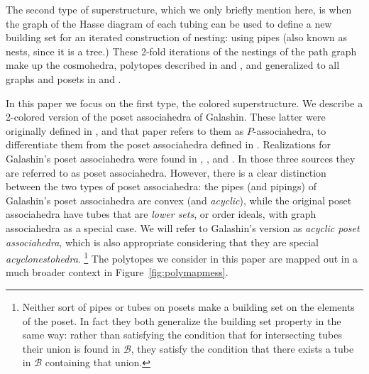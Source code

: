 \documentclass{article}
\begin{document}
The second type of superstructure, which we only briefly mention here, is when the graph of the Hasse diagram of each tubing can be used to define a new building set for an iterated construction of nesting: using pipes (also known as nests, since it is a tree.) These 2-fold iterations of the nestings of the path graph make up the cosmohedra, polytopes described in \cite{Arkani-Hamed:2024jbp} and \cite{ardilacosmo}, and generalized to all graphs and posets in \cite{Glew:2025otn} and \cite{forc-glew}. 

In this paper we focus on the first type, the colored superstructure. We describe a 2-colored version of the poset associahedra of Galashin. These latter were originally defined in \cite{galashin}, and that paper refers to them as $P$-associahedra, to differentiate them from the poset associahedra defined in \cite{dfrs}.  Realizations for Galashin's poset associahedra were found in \cite{sack}, \cite{mpp}, and \cite{mppfull}. In those three sources they are referred to as poset associahedra.  However, there is a clear distinction between the two types of poset associahedra: the pipes (and pipings) of Galashin's poset associahedra are convex (and \textit{acyclic}), while the original poset associahedra have tubes that are \textit{lower sets}, or order ideals, with graph associahedra as a special case. We will refer to Galashin's version as \textit{acyclic poset associahedra}, which is also appropriate considering that they are special \textit{acyclonestohedra}. \footnote{Neither sort of pipes or tubes on posets make a building set on the elements of the poset. In fact they both generalize the building set property in the same way: rather than satisfying the condition that for intersecting tubes their union is found in $\mathcal{B}$, they satisfy the condition that there exists a tube in $\mathcal{B}$ containing that union.} The polytopes we consider in this paper are mapped out in a much broader context in Figure~\ref{fig:polymapmess}.
\end{document}
